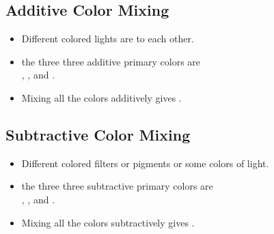 \documentclass[11pt,landscape]{exam}
\begin{document}
\begin{multicols}{2}
  \columnbreak

  \subsection*{Additive Color Mixing}

  \begin{itemize}
    \item Different colored lights are \fillin[added][8em] to each other.  \vspace{0.5em}
    \item the three three additive primary colors are \\\fillin[red][7em], \fillin[green][7em], and \fillin[blue][7em].
    
    \begin{center}
    \end{center}

    \item Mixing all the colors additively gives \fillin[white][8em].
  \end{itemize}


  \vspace{2em}

  \subsection*{Subtractive Color Mixing}

  \begin{itemize}
    \item Different colored filters or pigments \fillin[absorb][6em] or \fillin[subtract][6em] some colors of light. \vspace{0.5em}
    \item the three three subtractive primary colors are \\\fillin[cyan][7em], \fillin[magenta][7em], and \fillin[yellow][7em]. \vspace{0.5em}
    \item Mixing all the colors subtractively gives \fillin[black][7em].
  \end{itemize}


\end{multicols}
\end{document}
